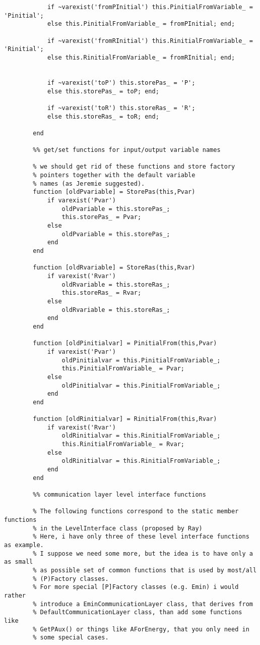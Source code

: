 \begin{verbatim}
            if ~varexist('fromPInitial') this.PinitialFromVariable_ = 'Pinitial';
            else this.PinitialFromVariable_ = fromPInitial; end;

            if ~varexist('fromRInitial') this.RinitialFromVariable_ = 'Rinitial';
            else this.RinitialFromVariable_ = fromRInitial; end;

            
            if ~varexist('toP') this.storePas_ = 'P';
            else this.storePas_ = toP; end;

            if ~varexist('toR') this.storeRas_ = 'R';
            else this.storeRas_ = toR; end;

        end
        
        %% get/set functions for input/output variable names

        % we should get rid of these functions and store factory
        % pointers together with the default variable 
        % names (as Jeremie suggested).
        function [oldPvariable] = StorePas(this,Pvar)
            if varexist('Pvar') 
                oldPvariable = this.storePas_;
                this.storePas_ = Pvar;
            else
                oldPvariable = this.storePas_;
            end
        end

        function [oldRvariable] = StoreRas(this,Rvar)
            if varexist('Rvar') 
                oldRvariable = this.storeRas_;
                this.storeRas_ = Rvar;
            else
                oldRvariable = this.storeRas_;
            end
        end
        
        function [oldPinitialvar] = PinitialFrom(this,Pvar)
            if varexist('Pvar') 
                oldPinitialvar = this.PinitialFromVariable_;
                this.PinitialFromVariable_ = Pvar;
            else
                oldPinitialvar = this.PinitialFromVariable_;
            end
        end

        function [oldRinitialvar] = RinitialFrom(this,Rvar)
            if varexist('Rvar') 
                oldRinitialvar = this.RinitialFromVariable_;
                this.RinitialFromVariable_ = Rvar;
            else
                oldRinitialvar = this.RinitialFromVariable_;
            end
        end
        
        %% communication layer level interface functions

        % The following functions correspond to the static member functions
        % in the LevelInterface class (proposed by Ray)
        % Here, i have only three of these level interface functions as example. 
        % I suppose we need some more, but the idea is to have only a as small 
        % as possible set of common functions that is used by most/all 
        % (P)Factory classes. 
        % For more special [P]Factory classes (e.g. Emin) i would rather
        % introduce a EminCommunicationLayer class, that derives from 
        % DefaultCommunicationLayer class, than add some functions like
        % GetPAux() or things like AForEnergy, that you only need in 
        % some special cases.


\end{verbatim}
